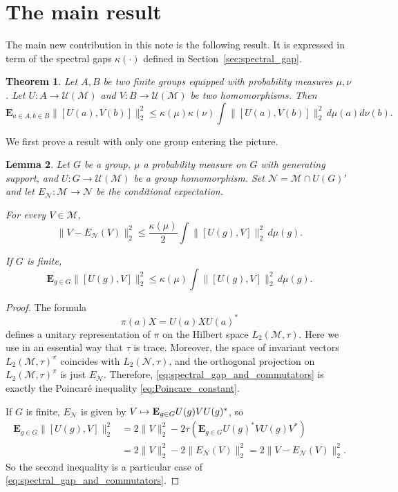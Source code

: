\documentclass[10pt]{amsart}
\newcommand\mto{\mathchoice{\longmapsto}{\mapsto}{\mapsto}{\mapsto}}
\theoremstyle{plain}
\newtheorem{theorem}{Theorem}[section]
\newtheorem{lemma}[theorem]{Lemma}
\theoremstyle{definition}
\newcommand{\cM}{\mathcal{M}}
\newcommand{\cN}{\mathcal{N}}
\newcommand{\E}{\mathbf{E}}
\newcommand{\cU}{\mathcal{U}}
\begin{document}
\section{The main result}\label{sec:main}
The main new contribution in this note is the following result. It is expressed in term of the spectral gaps $\kappa(\cdot)$ defined in Section~\ref{sec:spectral_gap}.

\begin{theorem}\label{thm:almost_commutation}
Let $A,B$ be two finite groups equipped with probability measures $\mu,\nu$.
Let $U:A \to \cU(\cM)$ and $V:B \to \cU(\cM)$ be two homomorphisms. Then
\[
\E_{a \in A,b\in B} \| [U(a),V(b)]\|_2^2 \leq \kappa(\mu)\kappa(\nu) \int \| [U(a),V(b)]\|_2^2 \,d\mu(a) d\nu(b).
\]
\end{theorem}

We first prove a result with only one group entering the picture.
\begin{lemma}\label{lemma:spectral_gap_commutator} Let $G$ be a group, $\mu$ a probability measure on $G$ with generating support, and $U\colon G\to \cU(\cM)$ be a group homomorphism. Set $\cN=\cM \cap U(G)'$ and let \hbox{$E_\cN:\cM\to\cN$} be the conditional expectation.

For every $V \in \cM$,
\begin{equation}\label{eq:spectral_gap_and_commutators} \| V - E_\cN(V)\|_2^2 \leq \frac{\kappa(\mu)}{2} \int \|[U(g),V]\|_2^2 \,d\mu(g).
\end{equation}

If $G$ is finite,
\[
\E_{g \in G} \|[U(g),V]\|_2^2 \leq \kappa(\mu) \int \|[U(g),V]\|_2^2 \,d\mu(g).
\]
\end{lemma}
\begin{proof} The formula
\[
\pi(a) X = U(a) X U(a)^*
\]
defines a unitary representation of $\pi$ on the Hilbert space $L_2(\cM,\tau)$. Here we use in an essential way that $\tau$ is trace. Moreover, the space of invariant vectors $L_2(\cM,\tau)^\pi$ coincides with $L_2(\cN,\tau)$, and the orthogonal projection on $L_2(\cM,\tau)^\pi$ is just $E_\cN$. Therefore, \eqref{eq:spectral_gap_and_commutators} is exactly the Poincaré inequality \eqref{eq:Poincare_constant}.

If $G$ is finite, $E_\cN$ is given by $V\mto \E_{g\in G} U(g) V U(g)^*$, so
\begin{align*} \E_{g \in G} \|[U(g),V]\|_2^2 &= 2\|V\|_2^2-2\tau(\E_{g \in G} U(g)^* V U(g)V^*)\\& = 2\|V\|_2^2-2\|E_\cN(V)\|_2^2 = 2\|V-E_\cN(V)\|_2^2.
\end{align*}
So the second inequality is a particular case of \eqref{eq:spectral_gap_and_commutators}.
\end{proof}
\end{document}
